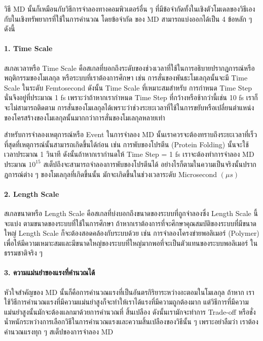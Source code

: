 วิธี MD นั้นก็เหมือนกับวิธีการจำลองทางคอมพิวเตอร์อื่น ๆ ที่มีข้อจำกัดทั้งในเชิงตัวโมเดลของวิธีเองกับในเชิงทรัพยากรที่ใช้ในการคำนวณ โดยข้อจำกัด%
ของ MD สามารถแบ่งออกได้เป็น 4 ข้อหลัก ๆ ดังนี้

\paragraph{1. Time Scale} สเกลเวลาหรือ Time Scale คือสเกลที่บอกถึงระดับของช่วงเวลาที่ใช้ในการอธิบายปรากฎการณ์หรือพฤติกรรมของโมเลกุล%
หรือระบบที่เราต้องการศึกษา เช่น การสั่นของพันธะโมเลกุลนั้นจะมี Time Scale ในระดับ Femtosecond ดังนั้น Time Scale ที่เหมาะสมสำหรับ%
การกำหนด Time Step นั่นจึงอยู่ที่ประมาณ 1 fs เพราะว่าถ้าหากเรากำหนด Time Step ที่กว้างหรือช้ากว่านี้เช่น 10 fs เราก็จะไม่สามารถติดตาม%
การสั่นของโมเลกุลได้เพราะว่าช่วงระยะเวลาที่ใช้ในการขยับหรือเปลี่ยนตำแหน่งของโครสร้างของโมเลกุลนั้นมากกว่าการสั่นของโมเลกุลหลายเท่า

สำหรับการจำลองเหตุการณ์หรือ Event ในการจำลอง MD นั้นเราควรจะต้องทราบถึงระยะเวลาที่เร็วที่สุดที่เหตุการณ์นั้นสามารถเกิดขึ้นได้ก่อน เช่น
การพับของโปรตีน (Protein Folding) นั้นจะใช้เวลาประมาณ 1 วินาที ดังนั้นถ้าหากเรากำนดให้ Time Step = 1 fs เราจะต้องทำการจำลอง
MD ประมาณ $10^{15}$ สเต็ปถึงจะสามารถจำลองการพับของโปรตีนได้ อย่างไรก็ตามในความเป็นจริงนั้นปรากฎการณ์ต่าง ๆ ของโมเลกุลที่เกิดขึ้นนั้น%
มักจะเกิดขึ้นในช่วงเวลาระดับ Microsecond $(\mu s)$

\paragraph{2. Length Scale} สเกลขนาดหรือ Length Scale คือสเกลที่บ่งบอกถึงขนาดของระบบที่ถูกจำลองซึ่ง Length Scale นี้จะแบ่ง%
ตามขนาดของระบบที่ใช้ในการศึกษา ถ้าหากเราต้องการที่จะศึกษาคุณสมบัติของระบบที่มีขนาดใหญ่ Length Scale ก็จะต้องสอดคล้องกับระบบด้วย
เช่น การจำลองโครงข่ายพอลิเมอร์ (Polymer) เพื่อให้มีความเหมาะสมและมีขนาดใหญ่ของระบบที่ใหญ่มากพอที่จะเป็นตัวแทนของระบบพอลิเมอร์%
ในธรรมชาติจริง ๆ

\paragraph{3. ความแม่นยำของแรงที่คำนวณได้} หัวใจสำคัญของ MD นั้นก็คือการคำนวณแรงที่เป็นอันตรกิริยาระหว่างอะตอมในโมเลกุล ถ้าหาก%
เราใช้วิธีการคำนวณแรงที่มีความแม่นยำสูงก็จะทำให้เราได้แรงที่มีความถูกต้องมาก แต่วิธีการที่มีความแม่นยำสูงนั้นมักจะต้องแลกมาด้วยการคำนวณที่%
สิ้นเปลือง ดังนั้นเรามักจะทำการ Trade-off หรือชั่งน้ำหนักระหว่างการเลือกวิธีในการคำนวณแรงและความสิ้นเปลืองของวิธีนั้น ๆ เพราะอย่าลืมว่า%
เราต้องคำนวณแรงทุก ๆ สเต็ปของการจำลอง MD

